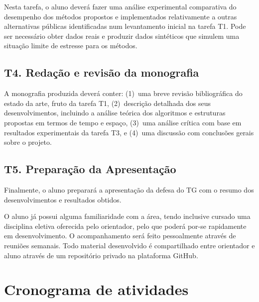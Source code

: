 \documentclass[12pt, a4paper, oneside]{article}
\begin{document}
Nesta tarefa, o aluno deverá fazer uma análise experimental comparativa do desempenho dos métodos propostos e implementados relativamente a outras alternativas públicas identificadas num levantamento inicial na tarefa T1. Pode ser necessário obter dados reais e produzir dados sintéticos que simulem uma situação limite de estresse para os métodos.


\subsection{T4. Redação e revisão da monografia}

A monografia produzida deverá conter:
(1)~uma breve revisão bibliográfica do estado da arte, fruto da tarefa T1, (2)~descrição detalhada dos seus desenvolvimentos, incluindo a análise teórica dos algoritmos e estruturas propostas em termos de tempo e espaço, (3)~uma análise crítica com base em resultados experimentais da tarefa T3, e (4)~uma discussão com conclusões gerais sobre o projeto.


\subsection{T5. Preparação da Apresentação}

Finalmente, o aluno preparará a apresentação da defesa do TG com o resumo dos desenvolvimentos e resultados obtidos.

\medskip

O aluno já possui alguma familiaridade com a área, tendo inclusive cursado uma disciplina eletiva oferecida pelo orientador, pelo que poderá por-se rapidamente em desenvolvimento. O acompanhamento será feito pessoalmente através de reuniões semanais. Todo material desenvolvido é compartilhado entre orientador e aluno através de um repositório privado na plataforma GitHub. 


\clearpage
\section{Cronograma de atividades}
\end{document}
